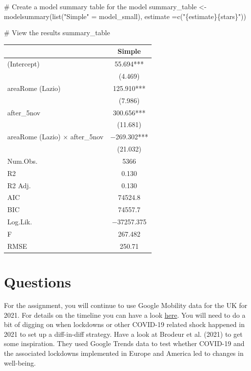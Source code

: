 \documentclass[
  letterpaper,
  DIV=11,
  numbers=noendperiod]{scrreprt}
\newenvironment{Shaded}{\begin{snugshade}}{\end{snugshade}}
\newcommand{\AttributeTok}[1]{\textcolor[rgb]{0.40,0.45,0.13}{#1}}
\newcommand{\CommentTok}[1]{\textcolor[rgb]{0.37,0.37,0.37}{#1}}
\newcommand{\FunctionTok}[1]{\textcolor[rgb]{0.28,0.35,0.67}{#1}}
\newcommand{\NormalTok}[1]{\textcolor[rgb]{0.00,0.23,0.31}{#1}}
\newcommand{\OtherTok}[1]{\textcolor[rgb]{0.00,0.23,0.31}{#1}}
\newcommand{\StringTok}[1]{\textcolor[rgb]{0.13,0.47,0.30}{#1}}
\begin{document}
\begin{Shaded}
\begin{Highlighting}[]
\CommentTok{\# Create a model summary table for the model}
\NormalTok{summary\_table }\OtherTok{\textless{}{-}} \FunctionTok{modelsummary}\NormalTok{(}\FunctionTok{list}\NormalTok{(}\StringTok{"Simple"} \OtherTok{=}\NormalTok{ model\_small), }\AttributeTok{estimate =}\FunctionTok{c}\NormalTok{(}\StringTok{"\{estimate\}\{stars\}"}\NormalTok{))}

\CommentTok{\# View the results}
\NormalTok{summary\_table}
\end{Highlighting}
\end{Shaded}

\begin{table}
\centering
\begin{tabular}[t]{lc}
\toprule
  & Simple\\
\midrule
(Intercept) & \num{55.694}***\\
 & (\num{4.469})\\
areaRome (Lazio) & \num{125.910}***\\
 & (\num{7.986})\\
after\_5nov & \num{300.656}***\\
 & (\num{11.681})\\
areaRome (Lazio) × after\_5nov & \num{-269.302}***\\
 & (\num{21.032})\\
\midrule
Num.Obs. & \num{5366}\\
R2 & \num{0.130}\\
R2 Adj. & \num{0.130}\\
AIC & \num{74524.8}\\
BIC & \num{74557.7}\\
Log.Lik. & \num{-37257.375}\\
F & \num{267.482}\\
RMSE & \num{250.71}\\
\bottomrule
\end{tabular}
\end{table}

\hypertarget{questions-6}{%
\section{Questions}\label{questions-6}}

For the assignment, you will continue to use Google Mobility data for
the UK for 2021. For details on the timeline you can have a look
\href{https://www.instituteforgovernment.org.uk/sites/default/files/2022-12/timeline-coronavirus-lockdown-december-2021.pdf}{here}.
You will need to do a bit of digging on when lockdowns or other COVID-19
related shock happened in 2021 to set up a diff-in-diff strategy. Have a
look at Brodeur et al. (2021) to get some inspiration. They used Google
Trends data to test whether COVID-19 and the associated lockdowns
implemented in Europe and America led to changes in well-being.
\end{document}
